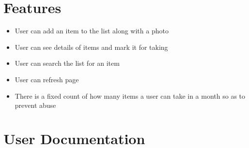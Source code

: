 \documentclass[12pt, a4paper]{article}
\begin{document}
\section{\textbf{Features}}
\begin{itemize}
    \item User can add an item to the list along with a photo
    \item User can see details of items and mark it for taking
    \item User can search the list for an item
    \item User can refresh page
    \item There is a fixed count of how many items a user can take in a month so as to prevent abuse
\end{itemize}
\section{\textbf{User Documentation}}
\end{document}
